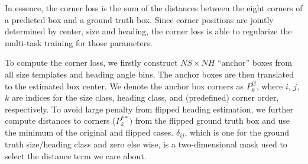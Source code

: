 In essence, the corner loss is the sum of the distances between the eight corners of a predicted box and a ground truth box. Since corner positions are jointly determined by center, size and heading, the corner loss is able to regularize the multi-task training for those parameters.

To compute the corner loss, we firstly construct $NS \times NH$ ``anchor'' boxes from all size templates and heading angle bins. The anchor boxes are then translated to the estimated box center. We denote the anchor box corners as $P_k^{ij}$, where $i$, $j$, $k$ are indices for the size class, heading class, and (predefined) corner order, respectively.
To avoid large penalty from flipped heading estimation, we further compute distances to corners ($P_k^{**})$ from the flipped ground truth box and use the minimum of the original and flipped cases. $\delta_{ij}$, which is one for the ground truth size/heading class and zero else wise, is a two-dimensional mask used to select the distance term we care about.





